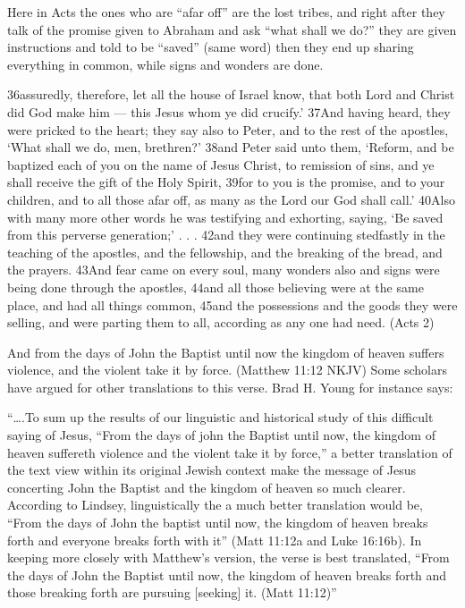 \documentclass[11pt]{article}
\begin{document}
Here in Acts the ones who are “afar off” are the lost tribes, and right after they talk of the promise given to Abraham and ask “what shall we do?” they are
given instructions and told to be “saved” (same word) then they end up
sharing everything in common, while signs and wonders are done.


36assuredly, therefore, let all the house of Israel know, that both Lord and Christ did God make him — this Jesus whom ye did crucify.’ 37And having heard, they were pricked to the heart; they say also to Peter, and to the rest of the apostles, ‘What shall we do, men, brethren?’ 38and Peter said unto them, ‘Reform, and be baptized each of you on the name of Jesus Christ, to remission of sins, and ye shall receive the gift of the Holy Spirit, 39for to you is the promise, and to your children, and to all those afar off, as many as the Lord our God shall call.’ 40Also with many more other words he was testifying and exhorting, saying, ‘Be saved from this perverse generation;’
. . .
42and they were continuing stedfastly in the teaching of the apostles, and the fellowship, and the breaking of the bread, and the prayers.
43And fear came on every soul, many wonders also and signs were being done through the apostles, 44and all those believing were at the same place, and had all things common, 45and the possessions and the goods they were selling, and were parting them to all, according as any one had need. (Acts 2)

And from the days of John the Baptist until now the
kingdom of heaven suffers violence, and the violent take it by force.
(Matthew 11:12 NKJV)
Some scholars have argued for other translations to this verse. Brad
H. Young for instance says:

“….To sum up the results of our linguistic and historical study of
this difficult saying of Jesus, “From the days of john the Baptist
until now, the kingdom of heaven suffereth violence and the violent
take it by force,” a better translation of the text view within its
original Jewish context make the message of Jesus concerting John the
Baptist and the kingdom of heaven so much clearer. According to
Lindsey, linguistically the a much better translation would be, “From
the days of John the baptist until now, the kingdom of heaven breaks
forth and everyone breaks forth with it” (Matt 11:12a and Luke
16:16b). In keeping more closely with Matthew’s version, the verse is
best translated, “From the days of John the Baptist until now, the
kingdom of heaven breaks forth and those breaking forth are pursuing [seeking] it. (Matt 11:12)”
\end{document}
